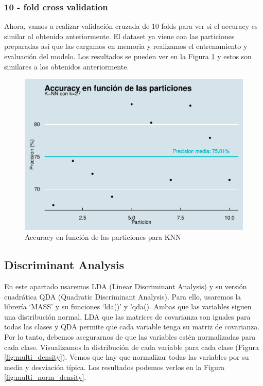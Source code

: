 \documentclass[
]{article}
\begin{document}
\hypertarget{fold-cross-validation}{%
\subsubsection{10 - fold cross validation}\label{fold-cross-validation}}

Ahora, vamos a realizar validación cruzada de 10 folds para ver si el
accuracy es similar al obtenido anteriormente. El dataset ya viene con
las particiones preparadas así que las cargamos en memoria y realizamos
el entrenamiento y evaluación del modelo. Los resultados se pueden ver
en la Figura \ref{fig:10f_knn} y estos son similares a los obtenidos
anteriormente.

\begin{figure}

{\centering \includegraphics[width=0.5\linewidth]{pima-clasificacion_files/figure-latex/10f_knn-1} 

}

\caption{Accuracy en función de las particiones para KNN}\label{fig:10f_knn}
\end{figure}

\hypertarget{discriminant-analysis}{%
\subsection{Discriminant Analysis}\label{discriminant-analysis}}

En este apartado usaremos LDA (Linear Discriminant Analysis) y su
versión cuadrática QDA (Quadratic Discriminant Analysis). Para ello,
usaremos la librería `MASS' y su funciones `lda()' y 'qda(). Ambas que
las variables siguen una distribución normal, LDA que las matrices de
covarianza son iguales para todas las clases y QDA permite que cada
variable tenga su matriz de covarianza. Por lo tanto, debemos
asegurarnos de que las variables estén normalizadas para cada clase.
Visualizamos la distribución de cada variable para cada clase (Figura
\ref{fig:multi_density}). Vemos que hay que normalizar todas las
variables por su media y desviación típica. Los resultados podemos
verlos en la Figura \ref{fig:multi_norm_density}.
\end{document}

